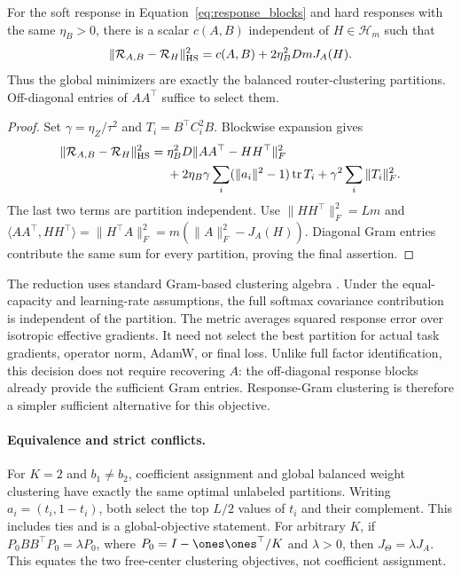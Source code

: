 \begin{theorem}
\label{thm:response-partition}
For the soft response in Equation~\eqref{eq:response_blocks} and hard
responses with the same $\eta_B>0$, there is a scalar $c(A,B)$ independent
of $H\in\mathcal H_m$ such that
\begin{equation}
 \|\mathcal R_{A,B}-\mathcal R_H\|_{\rm HS}^2
 =c(A,B)+2\eta_B^2 Dm J_A(H). \label{eq:response-partition}
\end{equation}
Thus the global minimizers are exactly the balanced router-clustering
partitions. Off-diagonal entries of $AA^\top$ suffice to select them.
\end{theorem}
\begin{proof}
Set $\gamma=\eta_Z/\tau^2$ and $T_i=B^\top C_i^2B$.
Blockwise expansion gives
\begin{align*}
 \|\mathcal R_{A,B}-\mathcal R_H\|_{\rm HS}^2
 ={}&\eta_B^2D\|AA^\top-HH^\top\|_F^2\\
 &+2\eta_B\gamma\sum_i(\|a_i\|^2-1)\operatorname{tr}T_i
   +\gamma^2\sum_i\|T_i\|_F^2.
\end{align*}
The last two terms are partition independent. Use
$\|HH^\top\|_F^2=Lm$ and
$\langle AA^\top,HH^\top\rangle=\|H^\top A\|_F^2
=m(\|A\|_F^2-J_A(H))$. Diagonal Gram entries contribute the same sum
for every partition, proving the final assertion.
\end{proof}

The reduction uses standard Gram-based clustering algebra
\citep{dhillon2004kernel}. Under the equal-capacity and learning-rate
assumptions, the full softmax covariance contribution is independent of
the partition. The metric averages
squared response error over isotropic effective gradients. It need not select
the best partition for actual task gradients, operator norm, AdamW, or final
loss. Unlike full factor identification, this decision does not require
recovering $A$: the off-diagonal response blocks already provide the
sufficient Gram entries. Response-Gram clustering is therefore a simpler
sufficient alternative for this objective.

\paragraph{Equivalence and strict conflicts.}
For $K=2$ and $b_1\ne b_2$, coefficient assignment and global balanced
weight clustering have exactly the same optimal unlabeled partitions.
Writing $a_i=(t_i,1-t_i)$, both select the top $L/2$ values of $t_i$ and
their complement. This includes ties and is a global-objective statement.
For arbitrary $K$, if
$P_0BB^\top P_0=\lambda P_0$, where
$P_0=I-\ones\ones^\top/K$ and $\lambda>0$, then
$J_\Theta=\lambda J_A$. This equates the two free-center clustering
objectives, not coefficient assignment.

